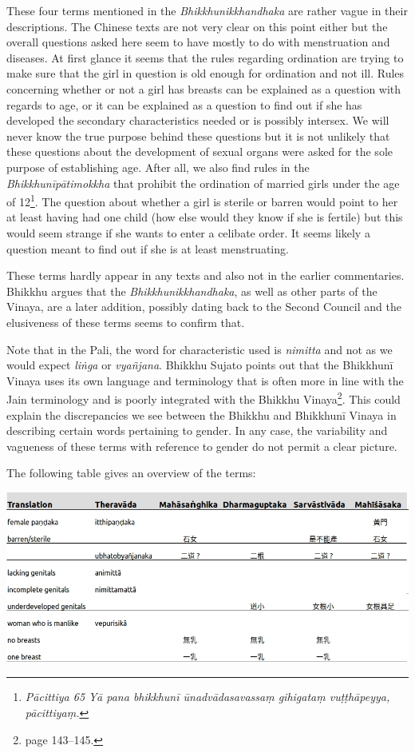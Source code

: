 These four terms mentioned in the {\em Bhikkhunikkhandhaka} are rather vague in their descriptions. The Chinese texts are not very clear on this point either but the overall questions asked here seem to have mostly to do with menstruation and diseases. At first glance it seems that the rules regarding ordination are trying to make sure that the girl in question is old enough for ordination and not ill. Rules concerning whether or not a girl has breasts can be explained as a question with regards to age, or it can be explained as a question to find out if she has developed the secondary characteristics needed or is possibly intersex. We will never know the true purpose behind these questions but it is not unlikely that these questions about the development of sexual organs were asked for the sole purpose of establishing age. After all, we also find rules in the {\em Bhikkhunīpātimokkha} that prohibit the ordination of married girls under the age of 12\footnote{{\em Pācittiya 65 Yā pana bhikkhunī ūnad­vāda­sa­vassaṃ gihigataṃ vuṭṭhāpeyya, pācittiyaṃ.}}. The question about whether a girl is sterile or barren would point to her at least having had one child (how else would they know if she is fertile) but this would seem strange if she wants to enter a celibate order. It seems likely a question meant to find out if she is at least menstruating. 

These terms hardly appear in any texts and also not in the earlier commentaries. Bhikkhu \cite{sujato2009} argues that the {\em Bhikkhunikkhandhaka}, as well as other parts of the Vinaya, are a later addition, possibly dating back to the Second Council and the elusiveness of these terms seems to confirm that.

Note that in the Pali, the word for characteristic used is {\em nimitta} and not as we would expect {\em liṅga} or {\em vyañ­jana}. Bhikkhu Sujato points out that the Bhikkhunī Vinaya uses its own language and terminology that is often more in line with the Jain terminology and is poorly integrated with the Bhikkhu Vinaya\footnote{\cite{sujato2009} page 143–145.}. This could explain the discrepancies we see between the Bhikkhu and Bhikkhunī Vinaya in describing certain words pertaining to gender. In any case, the variability and vagueness of these terms with reference to gender do not permit a clear picture. 

The following table gives an overview of the terms:

\bigskip
\includegraphics[width=\linewidth]{female.jpg}
\label{female}

